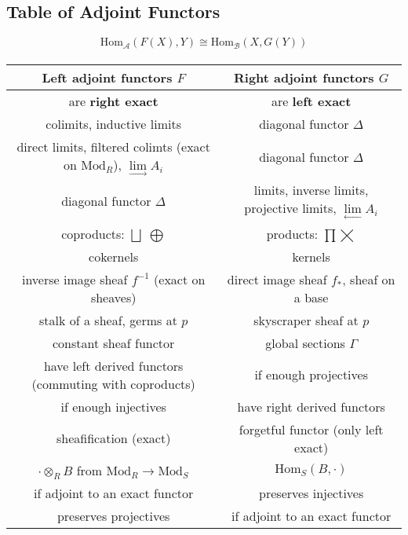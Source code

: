 \documentclass[12pt]{article}
\newcommand{\scr}[1]{\mathcal{#1}}
\newcommand{\Hom}{\mathrm{Hom}}
\newcommand{\Mod}{\mathrm{Mod}}
\begin{document}
\begin{center}
\section*{Table of Adjoint Functors}
\end{center}

\begin{equation*}
\Hom_{\scr{A}}(F(X), Y) \cong \Hom_{\scr{B}}(X, G(Y))
\end{equation*}
\paragraph{}

\begin{center}
\begin{tabular}{|c| c|}
\hline
\textbf{Left adjoint functors $F$} & \textbf{Right adjoint functors $G$} \\
\hline
are \textbf{right exact} & are \textbf{left exact} \\
colimits, inductive limits & diagonal functor $\Delta$ \\
direct limits, filtered colimts (exact on $\mathrm{Mod}_R$),  $\lim\limits_{\longrightarrow}A_i $ & diagonal functor $\Delta$ \\
diagonal functor $\Delta$ & limits, inverse limits, projective limits, $\lim\limits_{\longleftarrow} A_i$ \\
coproducts: $\bigsqcup$ $\bigoplus$ & products: $\prod \bigtimes$ \\ 
cokernels & kernels \\
inverse image sheaf $f^{-1}$ (exact on sheaves) & direct image sheaf $f_{*}$, sheaf on a base \\
stalk of a sheaf, germs at $p$ & skyscraper sheaf at $p$ \\
constant sheaf functor & global sections $\Gamma$ \\
have left derived functors (commuting with coproducts) &  if enough projectives \\
if enough injectives & have right derived functors \\
sheafification (exact) & forgetful functor (only left exact) \\
$\cdot \otimes_{R} B$ from $\Mod_{R} \to \Mod_{S}$ & $\Hom_{S}(B, \cdot)$ \\
if adjoint to an exact functor  & preserves injectives \\
preserves projectives & if adjoint to an exact functor \\

\end{tabular}
\end{center}
\end{document}
